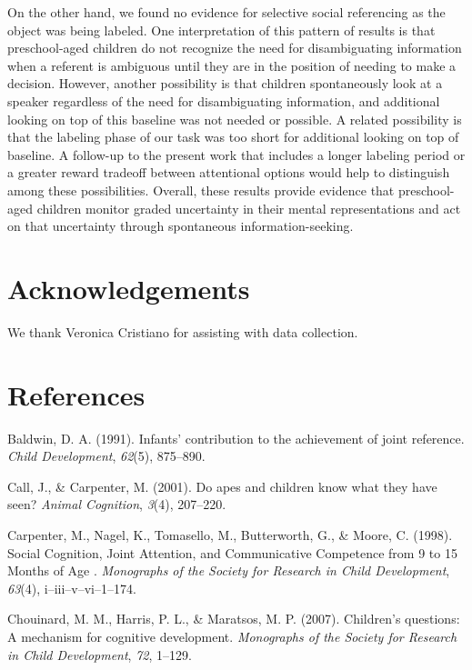 \documentclass[10pt, letterpaper]{article}
\begin{document}
On the other hand, we found no evidence for selective social referencing
as the object was being labeled. One interpretation of this pattern of
results is that preschool-aged children do not recognize the need for
disambiguating information when a referent is ambiguous until they are
in the position of needing to make a decision. However, another
possibility is that children spontaneously look at a speaker regardless
of the need for disambiguating information, and additional looking on
top of this baseline was not needed or possible. A related possibility
is that the labeling phase of our task was too short for additional
looking on top of baseline. A follow-up to the present work that
includes a longer labeling period or a greater reward tradeoff between
attentional options would help to distinguish among these possibilities.
Overall, these results provide evidence that preschool-aged children
monitor graded uncertainty in their mental representations and act on
that uncertainty through spontaneous information-seeking.

\section{Acknowledgements}\label{acknowledgements}

We thank Veronica Cristiano for assisting with data collection.

\section{References}\label{references}

\setlength{\parindent}{-0.1in} \setlength{\leftskip}{0.125in} \noindent

\hypertarget{refs}{}
\hypertarget{ref-Baldwin1991}{}
Baldwin, D. A. (1991). Infants' contribution to the achievement of joint
reference. \emph{Child Development}, \emph{62}(5), 875--890.

\hypertarget{ref-Call2001}{}
Call, J., \& Carpenter, M. (2001). Do apes and children know what they
have seen? \emph{Animal Cognition}, \emph{3}(4), 207--220.

\hypertarget{ref-Carpenter1998}{}
Carpenter, M., Nagel, K., Tomasello, M., Butterworth, G., \& Moore, C.
(1998). Social Cognition, Joint Attention, and Communicative Competence
from 9 to 15 Months of Age . \emph{Monographs of the Society for
Research in Child Development}, \emph{63}(4), i--iii--v--vi--1--174.

\hypertarget{ref-Chouinard2007}{}
Chouinard, M. M., Harris, P. L., \& Maratsos, M. P. (2007). Children's
questions: A mechanism for cognitive development. \emph{Monographs of
the Society for Research in Child Development}, \emph{72}, 1--129.
\end{document}
